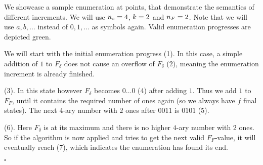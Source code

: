 \begin{example}
	We showcase a sample enumeration at points, that demonstrate the semantics of different increments. We will use ${n_s}=4$, $k=2$ and ${n_F}=2$. Note that we will use $a,b,\ldots$ instead of $0,1,\ldots$ as symbols again. Valid enumeration progresses are depicted green.\par
	\vspace{0.4cm}\noindent
	\begin{minipage}{0.56\textwidth}
		We will start with the initial enumeration progress (1). In this case, a simple addition of $1$ to $F_\delta$ does not cause an overflow of $F_\delta$ (2), meaning the enumeration increment is already finished.\newline
		
		(3). In this state however $F_\delta$ becomes $0\ldots0$ (4) after adding $1$. Thus we add $1$ to $F_F$, until it contains the required number of ones again (so we always have $f$ final states). The next $4$-ary number with $2$ ones after $0011$ is $0101$ (5).\newline
		
		(6). Here $F_\delta$ is at its maximum and there is no higher $4$-ary number with $2$ ones. So if the algorithm is now applied and tries to get the next valid $F_F$-value, it will eventually reach (7), which indicates the enumeration has found its end.
	\end{minipage}
	\hfill
	\begin{minipage}{0.4\textwidth}
	\end{minipage}\par
	\hfill$\square$
\end{example}

